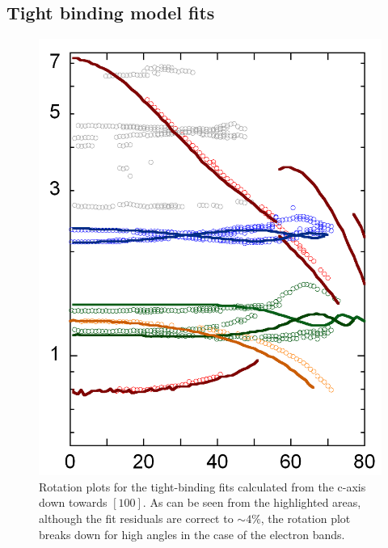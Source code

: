 \subsection{Tight binding model fits}
    \label{Sec:3:TightBindingFits}


\begin{figure}[h!]
    \begin{center}
        \includegraphics[scale=0.7]{Chapter3-dHvABaFe2P2/Figures/AngleDepMeasurements/TightBindingFits/TightBindingFits}
        \caption{Rotation plots for the tight-binding fits calculated from the c-axis down towards $[100]$. As can be seen from the highlighted areas, although the fit residuals are correct to $\sim4\%$, the rotation plot breaks down for high angles in the case of the electron bands.}
        \label{Fig:3:FullBandCharacterFermiSurface}
    \end{center}
\end{figure}


